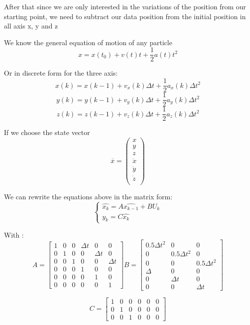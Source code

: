 \documentclass[12pt,a4paper]{report}
\begin{document}
After that since we are only interested in the variations of the position from our starting point, we need to subtract our  data position from the initial position in all axis x, y and z

We know the general equation of motion of any particle   
$$ x= x(t_0) + v(t) t + \dfrac12 a(t) t^2 $$

Or in discrete form for the three axis:
$$ x(k)= x(k-1) + v_x(k) \Delta t + \dfrac12 a_x(k) \Delta t^{2} $$
$$ y(k)= y(k-1) + v_y(k) \Delta t + \dfrac12 a_y(k) \Delta t^{2} $$
$$ z(k)= z(k-1) + v_z(k) \Delta t + \dfrac12 a_z(k) \Delta t^{2} $$

If we choose the state vector 
$$\overline{x}=\left(\begin{array}{c}
x\\
y\\
z\\
\dot{x}\\
\dot{y}\\
\dot{z}\\
\end{array}\right)$$
 
We can rewrite the equations above in the matrix form:
$$\left\{\begin{array}{c} \widehat{x_{k}} = A \widehat{x_{k-1}} +  B U_{k}  \\ y_k = C \widehat{x_{k}} \end{array}\right.$$

With :
$$ A= \left[\begin{array}{cccccc}
1& 0& 0& \Delta t & 0& 0\\ 0& 1& 0& 0& \Delta t& 0\\ 0& 0& 1& 0& 0& \Delta t\\ 0& 0& 0& 1& 0& 0\\ 0& 0& 0& 0& 1& 0\\ 0& 0& 0& 0& 0& 1 \end{array} \right]
 B= \left[\begin{array}{ccc}
0.5 \Delta t^{2}& 0& 0\\ 0& 0.5 \Delta t ^{2}& 0\\ 0& 0& 0.5\Delta t^{2}\\ \Delta& 0& 0\\ 0& \Delta t& 0 \\0& 0& \Delta t
 \end{array} \right]$$

$$ C= \left[\begin{array}{cccccc}
 1& 0& 0& 0& 0& 0\\0& 1& 0& 0& 0& 0\\0& 0& 1& 0& 0& 0
 \end{array} \right]$$
\end{document}

